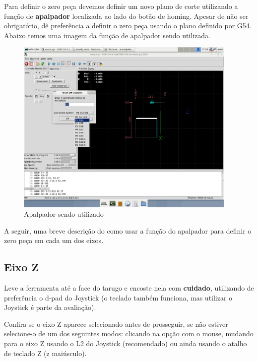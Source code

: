 \documentclass[twoside,a4paper]{refart}
\begin{document}
Para definir o zero peça devemos definir um novo plano de corte utilizando a função de \textbf{apalpador} localizada ao lado do botão de homing. Apesar de não ser obrigatório, dê preferência a definir o zero peça usando o plano definido por G54. Abaixo temos uma imagem da função de apalpador sendo utilizada.

\begin{figure}[H]
    \begin{center}
        \includegraphics[width=0.95\textwidth]{imagens/Definicao_do_zero_peca_g54.png}
    \end{center}
    \caption{Apalpador sendo utilizado}\label{G54}
\end{figure}


A seguir, uma breve descrição do como usar a função do apalpador para definir o zero peça em cada um dos eixos.

\subsection{Eixo Z}

Leve a ferramenta até a face do tarugo e encoste nela com \textbf{cuidado}, utilizando de preferência o d-pad do Joystick (o teclado também funciona, mas utilizar o Joystick é parte da avaliação). 

Confira se o eixo Z aparece selecionado antes de prosseguir, se não estiver selecione-o de um dos seguintes modos: clicando na opção com o mouse, mudando para o eixo Z usando o L2 do Joystick (recomendado) ou ainda usando o atalho de teclado Z (z maiúsculo).
\end{document}
